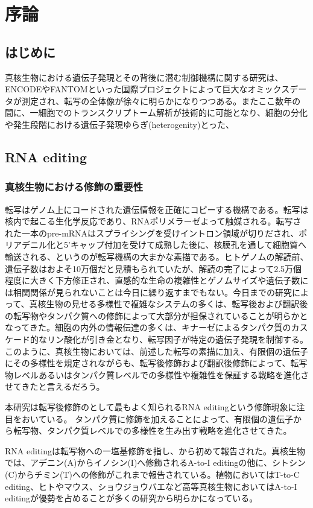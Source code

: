 \chapter{序論}

\section{はじめに}
真核生物における遺伝子発現とその背後に潜む制御機構に関する研究は、ENCODEやFANTOMといった国際プロジェクトによって巨大なオミックスデータが測定され、転写の全体像が徐々に明らかになりつつある。またここ数年の間に、一細胞でのトランスクリプトーム解析が技術的に可能となり、細胞の分化や発生段階における遺伝子発現ゆらぎ(heterogenity)とった、

\section{RNA editing}
\subsection{真核生物における修飾の重要性}
転写はゲノム上にコードされた遺伝情報を正確にコピーする機構である。転写は核内で起こる生化学反応であり、RNAポリメラーゼよって触媒される。転写された一本のpre-mRNAはスプライシングを受けイントロン領域が切りだされ、ポリアデニル化と5'キャップ付加を受けて成熟した後に、核膜孔を通して細胞質へ輸送される、というのが転写機構の大まかな素描である。ヒトゲノムの解読前、遺伝子数はおよそ10万個だと見積もられていたが、解読の完了によって2.5万個程度に大きく下方修正され、直感的な生命の複雑性とゲノムサイズや遺伝子数には相関関係が見られないことは今日に繰り返すまでもない。今日までの研究によって、真核生物の見せる多様性で複雑なシステムの多くは、転写後および翻訳後の転写物やタンパク質への修飾によって大部分が担保されていることが明らかとなってきた。細胞の内外の情報伝達の多くは、キナーゼによるタンパク質のカスケード的なリン酸化が引き金となり、転写因子が特定の遺伝子発現を制御する。このように、真核生物においては、前述した転写の素描に加え、有限個の遺伝子にその多様性を規定されながらも、転写後修飾および翻訳後修飾によって、転写物レベルあるいはタンパク質レベルでの多様性や複雑性を保証する戦略を進化させてきたと言えるだろう。
\par
本研究は転写後修飾のとして最もよく知られるRNA editingという修飾現象に注目をおいている。
タンパク質に修飾を加えることによって、有限個の遺伝子から転写物、タンパク質レベルでの多様性を生み出す戦略を進化させてきた。
\par
RNA editingは転写物への一塩基修飾を指し、から初めて報告された。真核生物では、アデニン(A)からイノシン(I)へ修飾されるA-to-I editingの他に、シトシン(C)からチミン(T)への修飾がこれまで報告されている。植物においてはT-to-C editing、ヒトやマウス、ショウジョウバエなど高等真核生物においてはA-to-I editingが優勢を占めることが多くの研究から明らかになっている。

